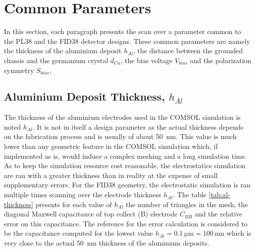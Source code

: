 \section{Common Parameters}

In this section, each paragraph presents the scan over a parameter common to the PL38 and the FID38 detector designs. These common parameters are namely the thickness of the aluminium deposit $h_{Al}$, the distance between the grounded chassis and the germanium crystal $d_{Cu}$, the bias voltage $V_{bias}$ and the polarization symmetry $S_{bias}$.


\subsection{Aluminium Deposit Thickness, $h_{Al}$}

The thickness of the aluminium electrodes used in the COMSOL simulation is noted $h_{Al}$. It is not in itself a design parameter as the actual thickness depends on the fabrication process and is usually of about \SI{50}{\nano\meter}. This value is much lower than any geometric feature in the COMSOL simulation which, if implemented as is, would induce a complex meshing and a long simulation time. As to keep the simulation resource cost reasonable, the electrostatics simulation are ran with a greater thickness than in reality at the expense of small supplementary errors. For the FID38 geometry, the electrostatic simulation is ran multiple times scanning over the electrode thickness $h_{Al}$. The table \ref{tab:al-thickness} presents for each value of $h_{Al}$ the number of triangles in the mesh, the diagonal Maxwell capacitance of top collect (B) electrode $C_{BB}$ and the relative error on this capacitance. The reference for the error calculation is considered to be the capacitance computed for the lowest value $h_{Al}=\SI{0.1}{\micro\meter} = \SI{100}{\nano\meter}$ which is very close to the actual \SI{50}{\nano\meter} thickness of the aluminium deposits.

